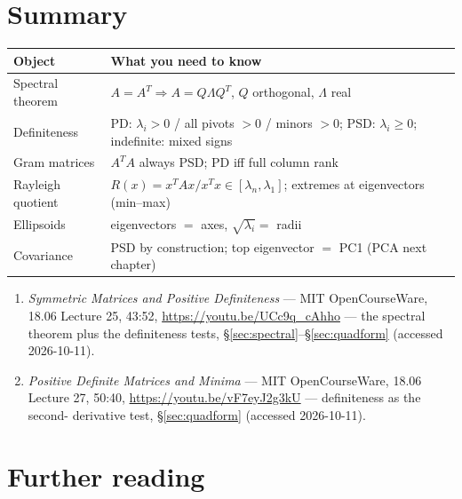 \section{Summary}

\begin{center}
\begin{tabularx}{\textwidth}{l>{\raggedright\arraybackslash}X}
\toprule
\textbf{Object} & \textbf{What you need to know}\\
\midrule
Spectral theorem & $A=A^{T}\Rightarrow A=Q\Lambda Q^{T}$, $Q$ orthogonal,
$\Lambda$ real \\
Definiteness & PD: $\lambda_i>0$ / all pivots $>0$ / minors $>0$; PSD:
$\lambda_i\ge0$; indefinite: mixed signs \\
Gram matrices & $A^{T}A$ always PSD; PD iff full column rank \\
Rayleigh quotient & $R(x)=x^{T}Ax/x^{T}x\in[\lambda_n,\lambda_1]$;
extremes at eigenvectors (min--max) \\
Ellipsoids & eigenvectors $=$ axes, $\sqrt{\lambda_i}=$ radii \\
Covariance & PSD by construction; top eigenvector $=$ PC1 (PCA next
chapter) \\
\bottomrule
\end{tabularx}
\end{center}
\begin{rulebox}
\begin{enumerate}
\item \emph{Symmetric Matrices and Positive Definiteness} --- MIT
OpenCourseWare, 18.06 Lecture 25, 43:52,
\url{https://youtu.be/UCc9q_cAhho} --- the spectral theorem plus the
definiteness tests, \S\ref{sec:spectral}--\S\ref{sec:quadform}
(accessed 2026-10-11).
\item \emph{Positive Definite Matrices and Minima} --- MIT
OpenCourseWare, 18.06 Lecture 27, 50:40,
\url{https://youtu.be/vF7eyJ2g3kU} --- definiteness as the second-
derivative test, \S\ref{sec:quadform} (accessed 2026-10-11).
\end{enumerate}
\end{rulebox}

\section*{Further reading}

